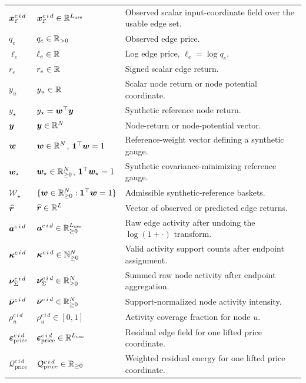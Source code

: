 \begin{center}
\begin{longtable}{>{\raggedright\arraybackslash}p{}
                  >{\raggedright\arraybackslash}p{}
                  >{\raggedright\arraybackslash}p{}}
$\bm{x}_{\mathcal{E}}^{c\,i\,d}$ & $\bm{x}_{\mathcal{E}}^{c\,i\,d}\in\mathbb{R}^{L_{\mathrm{use}}}$ & Observed scalar input-coordinate field over the usable edge set. \\
$q_e$ & $q_e \in \mathbb{R}_{>0}$ & Observed edge price. \\
$\ell_e$ & $\ell_e \in \mathbb{R}$ & Log edge price, $\ell_e=\log q_e$. \\
$r_e$ & $r_e \in \mathbb{R}$ & Signed scalar edge return. \\
$y_u$ & $y_u \in \mathbb{R}$ & Scalar node return or node potential coordinate. \\
$y_{\star}$ & $y_{\star}=\bm{w}^{\top}\bm{y}$ & Synthetic reference node return. \\
$\bm{y}$ & $\bm{y} \in \mathbb{R}^N$ & Node-return or node-potential vector. \\
$\bm{w}$ & $\bm{w}\in\mathbb{R}^N$, $\mathbf{1}^{\top}\bm{w}=1$ & Reference-weight vector defining a synthetic gauge. \\
$\bm{w}_{\star}$ & $\bm{w}_{\star}\in\mathbb{R}_{\ge 0}^N$, $\mathbf{1}^{\top}\bm{w}_{\star}=1$ & Synthetic covariance-minimizing reference gauge. \\
$\mathcal{W}_{\star}$ & $\{\bm{w}\in\mathbb{R}_{\ge 0}^N:\mathbf{1}^{\top}\bm{w}=1\}$ & Admissible synthetic-reference baskets. \\
$\bm{\widehat{r}}$ & $\bm{\widehat{r}} \in \mathbb{R}^L$ & Vector of observed or predicted edge returns. \\
$\bm{a}^{c\,i\,d}$ & $\bm{a}^{c\,i\,d}\in\mathbb{R}_{\ge 0}^{L_{\mathrm{use}}}$ & Raw edge activity after undoing the $\log(1+\cdot)$ transform. \\
$\bm{\kappa}^{c\,i\,d}$ & $\bm{\kappa}^{c\,i\,d}\in\mathbb{N}_{\ge 0}^{N}$ & Valid activity support counts after endpoint assignment. \\
$\bm{\nu}_{\Sigma}^{c\,i\,d}$ & $\bm{\nu}_{\Sigma}^{c\,i\,d}\in\mathbb{R}_{\ge 0}^N$ & Summed raw node activity after endpoint aggregation. \\
$\bar{\bm{\nu}}^{c\,i\,d}$ & $\bar{\bm{\nu}}^{c\,i\,d}\in\mathbb{R}_{\ge 0}^N$ & Support-normalized node activity intensity. \\
$\rho_u^{c\,i\,d}$ & $\rho_u^{c\,i\,d}\in[0,1]$ & Activity coverage fraction for node $u$. \\
$\bm{\varepsilon}_{\mathrm{price}}^{c\,i\,d}$ & $\bm{\varepsilon}_{\mathrm{price}}^{c\,i\,d}\in\mathbb{R}^{L_{\mathrm{use}}}$ & Residual edge field for one lifted price coordinate. \\
$\mathcal{Q}_{\mathrm{price}}^{c\,i\,d}$ & $\mathcal{Q}_{\mathrm{price}}^{c\,i\,d}\in\mathbb{R}_{\ge 0}$ & Weighted residual energy for one lifted price coordinate. \\

\end{longtable}
\end{center}
